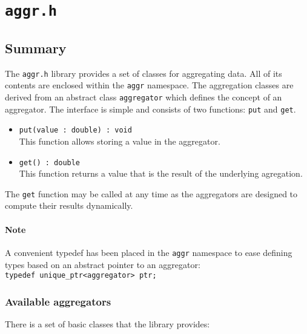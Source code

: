 
\section{\texttt{aggr.h}}

	\subsection{Summary}
	The \texttt{aggr.h} library provides a set of classes for aggregating data.
	All of its contents are enclosed within the \texttt{aggr} namespace. The
	aggregation classes are derived from an abstract class \texttt{aggregator}
	which defines the concept of an aggregator. The interface is simple and
	consists of two functions: \texttt{put} and \texttt{get}.

	\begin{itemize}
		\item \texttt{put(value : double) : void}\\
			This function allows storing a value in the aggregator.
		\item \texttt{get() : double}\\
			This function returns a value that is the result of the
			underlying agregation.
	\end{itemize}

	The \texttt{get} function may be called at any time as the aggregators are
	designed to compute their results dynamically. 

	\paragraph{Note}
	A convenient typedef has been placed in the \texttt{aggr} namespace to ease
	defining types based on an abstract pointer to an aggregator:\\
	\texttt{typedef unique\_ptr<aggregator> ptr;}

	\subsubsection{Available aggregators}
	There is a set of basic classes that the library provides:

